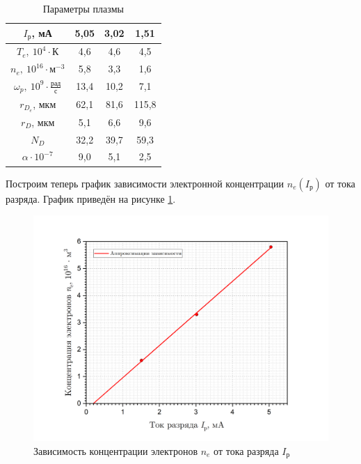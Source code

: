 \documentclass[a4paper, 12pt]{article}
\begin{document}
    \begin{table}[H]
        \centering
        \begin{tabular}{|c|c|c|c|}
            \hline
            $I_{\text{р}}$, мА & 5,05 & 3,02 & 1,51 \\ \hline
            $T_e,\ 10^4 \cdot \text{К}$ & 4,6 & 4,6 & 4,5 \\ \hline
            $n_e,\ 10^{16} \cdot \text{м}^{-3}$ & 5,8 & 3,3 & 1,6 \\ \hline
            $\omega_p,\ 10^9 \cdot \frac{\text{рад}}{\text{с}}$ & 13,4 & 10,2 & 7,1 \\ \hline
            $r_{D_e}$, мкм & 62,1 & 81,6 & 115,8 \\ \hline
            $r_{D}$, мкм & 5,1 & 6,6 & 9,6 \\ \hline
            $N_D$ & 32,2 & 39,7 & 59,3 \\ \hline
            $\alpha \cdot 10^{-7}$ & 9,0 & 5,1 & 2,5 \\ \hline
        \end{tabular}
        \caption{Параметры плазмы} 
        \label{table:results}
    \end{table}

    Построим теперь график зависимости электронной концентрации $n_e(I_{\text{р}})$ от тока разряда. График приведён на рисунке \ref{graph:conc}.
    
    \begin{figure}[H]
        \centering
        \includegraphics[width = 14 cm]{images/graph_nI.png}
        \caption{Зависимость концентрации электронов $n_e$ от тока разряда $I_{\text{р}}$} 
        \label{graph:conc}
    \end{figure}
\end{document}
